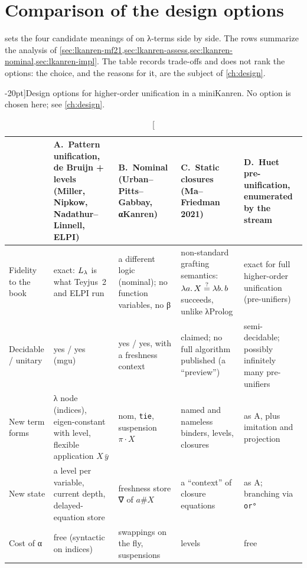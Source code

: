 \section{Comparison of the design options}\label{sec:lkanren-compare}

 sets the four candidate meanings of  on λ-terms side by side. The
rows summarize the analysis of \cref{sec:lkanren-mf21,sec:lkanren-assess,sec:lkanren-nominal,sec:lkanren-impl}. The table records trade-offs and does not rank the options: the choice,
and the reasons for it, are the subject of \cref{ch:design}.

\begin{table}[ht]
\footnotesize
\caption[][-20pt]{Design options for higher-order unification in a miniKanren. No option is
chosen here; see \cref{ch:design}.}
\label{tab:lkanren-options}
\renewcommand{\arraystretch}{1.25}
\begin{tabularx}{\linewidth}{>{\raggedright\arraybackslash}p{2.0cm}*{4}{>{\raggedright\arraybackslash}X}}
\toprule
& \textbf{A.\ Pattern unification, de Bruijn + levels} (Miller, Nipkow, Nadathur--Linnell, ELPI)
& \textbf{B.\ Nominal} (Urban--Pitts--Gabbay, αKanren)
& \textbf{C.\ Static closures} (Ma--Friedman 2021)
& \textbf{D.\ Huet pre-unification, enumerated by the stream}\\
\midrule
Fidelity to the book & exact: $L_\lambda$ is what Teyjus~2 and ELPI run & a different logic (nominal); no
function variables, no β & non-standard grafting semantics: $\lambda a.\,X\stackrel{?}{=}\lambda b.\,b$ succeeds, unlike
λProlog & exact for full higher-order unification (pre-unifiers)\\
Decidable / unitary & yes / yes (mgu) & yes / yes, with a freshness context & claimed; no full
algorithm published (a \enquote{preview}) & semi-decidable; possibly infinitely many pre-unifiers\\
New term forms & λ node (indices), eigen-constant with level, flexible application $X\,\bar y$ & nom,
\texttt{tie}, suspension $\pi\cdot X$ & named and nameless binders, levels, closures & as A, plus
imitation and projection\\
New state & a level per variable, current depth, delayed-equation store & freshness store ∇ of $a\#X$ &
a \enquote{context} of closure equations & as A; branching via \texttt{or°}\\
Cost of α & free (syntactic on indices) & swappings on the fly, suspensions & levels & free\\

\end{tabularx}
\end{table}
